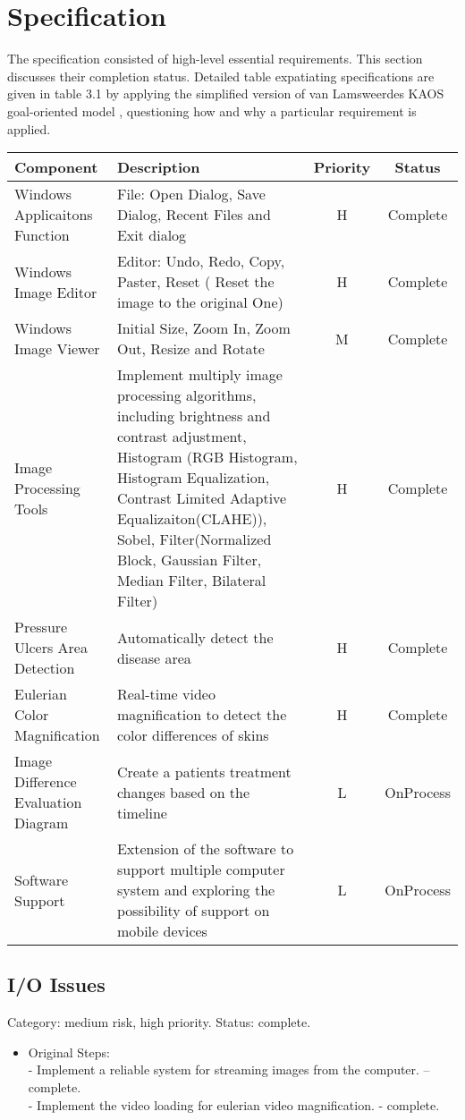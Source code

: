 \chapter{Specification} \label{chapter:model}
The specification consisted of high-level essential requirements. This section discusses their completion status. Detailed table expatiating specifications are given in table 3.1 by applying the simplified version of van Lamsweerde\textquotesingle s KAOS goal-oriented model \cite{kaos}, questioning how and why a particular requirement is applied. 
\begin{table}[H]
\small
{} \label{tab:title2} 
\begin{tabular}{ | m{3.7cm}| m{8cm} | c | c|} 
\hline
Component & Description & Priority & Status\\ 
\hline
Windows Applicaitons Function & File: Open Dialog, Save Dialog, Recent Files and Exit dialog & H & Complete \\
\hline
Windows Image Editor & Editor: Undo, Redo, Copy, Paster, Reset ( Reset the image to the original One) & H & Complete \\
\hline
Windows Image Viewer & Initial Size, Zoom In, Zoom Out, Resize and Rotate & M & Complete \\
\hline
Image Processing Tools & Implement multiply image processing algorithms, including brightness and contrast adjustment,  Histogram (RGB Histogram, Histogram Equalization, Contrast Limited Adaptive Equalizaiton(CLAHE)), Sobel, Filter(Normalized Block, Gaussian Filter, Median Filter, Bilateral Filter) & H & Complete \\
\hline
Pressure Ulcers Area Detection & Automatically detect the disease area & H & Complete \\
\hline
Eulerian Color Magnification & Real-time video magnification to detect the color differences of skins & H & Complete \\
\hline
Image Difference Evaluation Diagram & Create a patients treatment changes based on the timeline & L & OnProcess \\
\hline
Software Support & Extension of the software to support multiple computer system and exploring the possibility of support on mobile devices & L & OnProcess \\
\hline
\end{tabular}
\end{table}

\section{I/O Issues}
Category: medium risk, high priority. Status: complete.
\begin{itemize}
\item{Original Steps:}\\
- Implement a reliable system for streaming images from the computer. – complete.\\
- Implement the video loading for eulerian video magnification. - complete.
\end{itemize}

